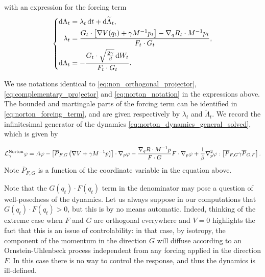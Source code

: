 with an expression for the forcing term
\begin{equation}
    \label{eq:norton_forcing_term}
    \left\{\begin{aligned}
        \mathrm{d} \Lambda_t &= \lambda_t \,\mathrm{d} t + \mathrm{d}\widetilde{\Lambda}_t,\\
        \lambda_t &= \frac{G_t\cdot\left[\nabla V(q_t) + \gamma M^{-1}p_t \right] - \nabla_q R_t\cdot M^{-1}p_t}{F_t\cdot G_t},\\
        \mathrm{d} \Lambda_t &= -\frac{G_t\cdot\sqrt{\frac{2\gamma}\beta}\,\mathrm{d} W_t}{F_t\cdot G_t}.
    \end{aligned}\right.
\end{equation}

We use notations identical to \eqref{eq:non_orthogonal_projector}, \eqref{eq:complementary_projector} and \eqref{eq:norton_notation} in the expressions above. The bounded and martingale parts of the forcing term can be identified in \eqref{eq:norton_forcing_term}, and are given respectively by $\lambda_t$ and $\widetilde{\Lambda}_t$. 
We record the infinitesimal generator of the dynamics \eqref{eq:norton_dynamics_general_solved}, which is given by

\begin{equation}
    \label{eq:norton_general_generator}
    \mathcal{L}_{\gamma}^{\mathrm{Norton}}\varphi = A \varphi - \left[\overline{P}_{F,G}\left(\nabla V+\gamma M^{-1}p\right)\right] \cdot \nabla_p\varphi - \frac{\nabla_q R \cdot M^{-1}p}{F\cdot G} F\cdot \nabla_p \varphi + \frac1\beta\nabla^2_p\varphi : \left[\overline{P}_{F,G}\gamma\overline{P}_{G,F}\right].
\end{equation}
Note $\overline{P}_{F,G}$ is a function of the coordinate variable in the equation above.
\begin{remark}
    \label{rem:norton_sv_well_posedness}
    Note that the $G(q_t)\cdot F(q_t)$ term in the denominator may pose a question of well-posedness of the dynamics. Let us always suppose in our computations that $G(q_t)\cdot F(q_t)>0$, but this is by no means automatic.
    Indeed, thinking of the extreme case when $F$ and $G$ are orthogonal everywhere and $V=0$ highlights the fact that this is an issue of controlability: in that case, by isotropy, the component of the momentum in the direction $G$ will diffuse according to an Ornstein-Uhlenbeck process independent from any forcing applied in the direction $F$. In this case there is no way to control the response, and thus the dynamics is ill-defined. 
\end{remark}

